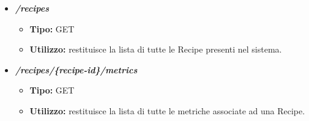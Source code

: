 \begin{itemize}

  \item \textit{\textbf{/recipes}}
  \begin{itemize}
    \item \textbf{Tipo:} GET
    \item \textbf{Utilizzo:} restituisce la lista di tutte le Recipe presenti nel sistema.
  \end{itemize}
  \item \textit{\textbf{/recipes/\{recipe-id\}/metrics}}
  \begin{itemize}
    \item \textbf{Tipo:} GET
    \item \textbf{Utilizzo:} restituisce la lista di tutte le metriche associate ad una Recipe.
  \end{itemize}


\end{itemize}
